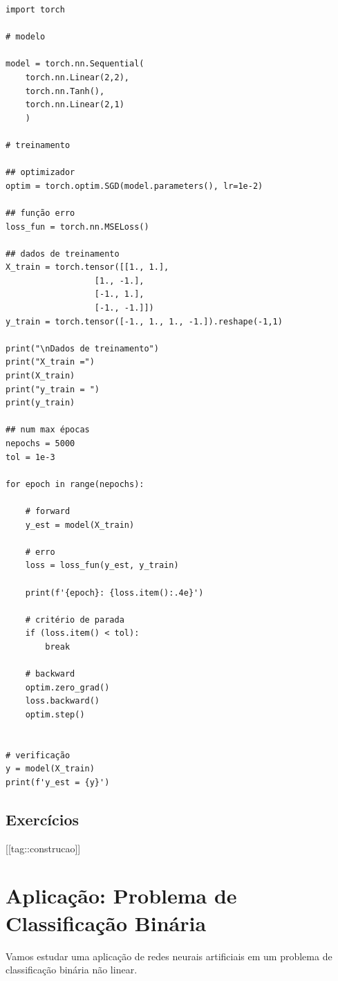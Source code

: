 % 
\begin{lstlisting}[caption=mlp\_xor.py, label=cap_mlp_sec_modelo:cod:mlp_xor]
import torch

# modelo

model = torch.nn.Sequential(
    torch.nn.Linear(2,2),
    torch.nn.Tanh(),
    torch.nn.Linear(2,1)
    )

# treinamento

## optimizador
optim = torch.optim.SGD(model.parameters(), lr=1e-2)

## função erro
loss_fun = torch.nn.MSELoss()

## dados de treinamento
X_train = torch.tensor([[1., 1.],
                  [1., -1.],
                  [-1., 1.],
                  [-1., -1.]])
y_train = torch.tensor([-1., 1., 1., -1.]).reshape(-1,1)

print("\nDados de treinamento")
print("X_train =")
print(X_train)
print("y_train = ")
print(y_train)

## num max épocas
nepochs = 5000
tol = 1e-3

for epoch in range(nepochs):

    # forward
    y_est = model(X_train)

    # erro
    loss = loss_fun(y_est, y_train)

    print(f'{epoch}: {loss.item():.4e}')

    # critério de parada
    if (loss.item() < tol):
        break

    # backward
    optim.zero_grad()
    loss.backward()
    optim.step()


# verificação
y = model(X_train)
print(f'y_est = {y}')
\end{lstlisting}

\subsection{Exercícios}

[[tag::construcao]]

\section{Aplicação: Problema de Classificação Binária}\label{cap_mlp_sec_classbin}

Vamos estudar uma aplicação de redes neurais artificiais em um problema de classificação binária não linear.

